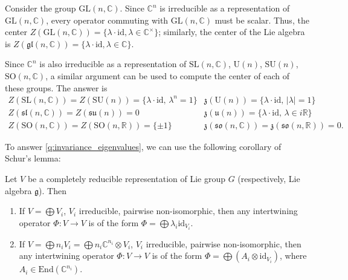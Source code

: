 \documentclass{report}
\begin{document}
\begin{example}
Consider the group \( \mathrm{GL}(n, \mathbb{C}) \). Since \( \mathbb{C}^n \) is irreducible as a representation of \( \mathrm{GL}(n, \mathbb{C}) \), every operator commuting with \( \mathrm{GL}(n, \mathbb{C}) \) must be scalar. Thus, the center \( Z(\mathrm{GL}(n, \mathbb{C})) = \{ \lambda \cdot \mathrm{id}, \lambda \in \mathbb{C}^\times \} \); similarly, the center of the Lie algebra is \( Z(\mathfrak{gl}(n, \mathbb{C})) = \{ \lambda \cdot \mathrm{id}, \lambda \in \mathbb{C} \} \).

Since \( \mathbb{C}^n \) is also irreducible as a representation of \( \mathrm{SL}(n, \mathbb{C}) \), \( \mathrm{U}(n) \), \( \mathrm{SU}(n) \), \( \mathrm{SO}(n, \mathbb{C}) \), a similar argument can be used to compute the center of each of these groups. The answer is
\[
\begin{array}{ll}
Z(\mathrm{SL}(n, \mathbb{C})) = Z(\mathrm{SU}(n)) = \{\lambda \cdot \mathrm{id}, \, \lambda^n = 1 \} & \mathfrak{z}(\mathrm{U}(n)) = \{ \lambda \cdot \mathrm{id}, \, |\lambda| = 1 \} \\
Z(\mathfrak{sl}(n, \mathbb{C})) = Z(\mathfrak{su}(n)) = 0 & \mathfrak{z}(\mathfrak{u}(n)) = \{ \lambda \cdot \mathrm{id}, \, \lambda \in i\mathbb{R} \} \\
Z(\mathrm{SO}(n, \mathbb{C})) = Z(\mathrm{SO}(n, \mathbb{R})) = \{\pm 1\} & \mathfrak{z}(\mathfrak{so}(n, \mathbb{C})) = \mathfrak{z}(\mathfrak{so}(n, \mathbb{R})) = 0.
\end{array}
\]
\end{example}

To answer \cref{q:invariance_eigenvalues}, we can use the following corollary of Schur's lemma:
\begin{corollary}
Let \( V \) be a completely reducible representation of Lie group \( G \) (respectively, Lie algebra \( \mathfrak{g} \)). Then
\begin{enumerate}
    \item If \( V = \bigoplus V_i \), \( V_i \) irreducible, pairwise non-isomorphic, then any intertwining operator \( \Phi : V \to V \) is of the form \( \Phi = \bigoplus \lambda_i \mathrm{id}_{V_i} \).
    \item If \( V = \bigoplus n_i V_i = \bigoplus n_i \mathbb{C}^{n_i} \otimes V_i \), \( V_i \) irreducible, pairwise non-isomorphic, then any intertwining operator \( \Phi : V \to V \) is of the form \( \Phi = \bigoplus (A_i \otimes \mathrm{id}_{V_i}) \), where \( A_i \in \mathrm{End}(\mathbb{C}^{n_i}) \).
\end{enumerate}
\end{corollary}
\end{document}
